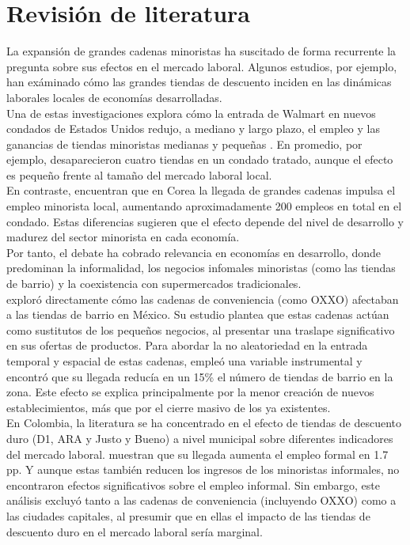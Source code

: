\documentclass{article}
\begin{document}
\newpage

\section{Revisión de literatura}

La expansión de grandes cadenas minoristas ha suscitado de forma recurrente la pregunta sobre sus efectos en el mercado laboral. Algunos estudios, por ejemplo, han exáminado  cómo las grandes tiendas de descuento inciden en las dinámicas laborales locales de economías desarrolladas. \\

Una de estas investigaciones explora cómo la entrada de Walmart en nuevos condados de Estados Unidos redujo, a mediano y largo plazo, el empleo y las ganancias de tiendas minoristas medianas y pequeñas \parencite{basker2005}. En promedio, por ejemplo, desaparecieron cuatro tiendas en un condado tratado, aunque el efecto es pequeño frente al tamaño del mercado laboral local.\\

En contraste, \textcite{cho2015} encuentran que en Corea la llegada de grandes cadenas impulsa el empleo minorista local, aumentando aproximadamente 200 empleos en total en el condado. Estas diferencias sugieren que el efecto depende del nivel de desarrollo y madurez del sector minorista en cada economía.\\

Por tanto, el debate ha cobrado relevancia en economías en desarrollo, donde predominan la informalidad, los negocios infomales minoristas (como las tiendas de barrio) y la coexistencia con supermercados tradicionales. \\

\textcite{marcos2022} exploró directamente cómo las cadenas de conveniencia (como OXXO) afectaban a las tiendas de barrio en México. Su estudio plantea que estas cadenas actúan como sustitutos de los pequeños negocios, al presentar una traslape significativo en sus ofertas de productos. Para abordar la no aleatoriedad en la entrada temporal y espacial de estas cadenas, empleó una variable instrumental y encontró que su llegada reducía en un 15\% el número de tiendas de barrio en la zona. Este efecto se explica principalmente por la menor creación de nuevos establecimientos, más que por el cierre masivo de los ya existentes. \\

En Colombia, la literatura se ha concentrado en el efecto de tiendas de descuento duro (D1, ARA y Justo y Bueno) a nivel municipal sobre diferentes indicadores del mercado laboral. \textcite{delgado2024} muestran que su llegada aumenta el empleo formal en 1.7 pp. Y aunque estas también reducen los ingresos de los minoristas informales, no encontraron efectos significativos sobre el empleo informal. Sin embargo, este análisis excluyó tanto a las cadenas de conveniencia (incluyendo OXXO) como a las ciudades capitales, al presumir que en ellas el impacto de las tiendas de descuento duro en el mercado laboral sería marginal. \\
\end{document}
